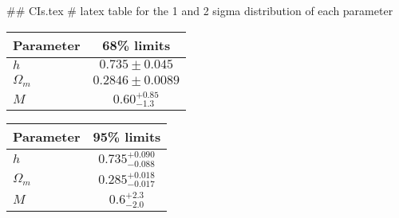 ## CIs.tex
# latex table for the 1 and 2 sigma distribution of each parameter

\begin{tabular} { l  c}
 Parameter &  68\% limits\\
\hline
{\boldmath$h              $} & $0.735\pm 0.045            $\\
{\boldmath$\Omega_m       $} & $0.2846\pm 0.0089          $\\
{\boldmath$M              $} & $0.60^{+0.85}_{-1.3}       $\\
\hline
\end{tabular}

\begin{tabular} { l  c}
 Parameter &  95\% limits\\
\hline
{\boldmath$h              $} & $0.735^{+0.090}_{-0.088}   $\\
{\boldmath$\Omega_m       $} & $0.285^{+0.018}_{-0.017}   $\\
{\boldmath$M              $} & $0.6^{+2.3}_{-2.0}         $\\
\hline
\end{tabular}
